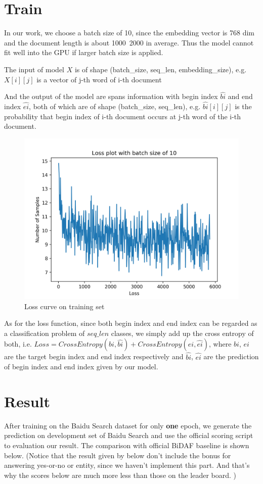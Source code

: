\documentclass{article}
\begin{document}
\section{Train}
In our work, we choose a batch size of 10, since the embedding vector is 768 dim and the document length is about 1000~2000 in average. Thus the model cannot fit well into the GPU if larger batch size is applied.

The input of model $X$ is of shape (batch\_size, seq\_len, embedding\_size), e.g. $X[i][j]$ is a vector of j-th word of i-th document 

And the output of the model are spans information with begin index $\hat{bi}$ and end index $\hat {ei}$, both of which are of shape (batch\_size, seq\_len), e.g. $\hat {bi}[i][j]$ is the probability that begin index of i-th document occurs at j-th word of the i-th document.

\begin{figure}[h]
	\centering
	\includegraphics[scale=0.4]{loss.png}
	\caption{Loss curve on training set}
\end{figure}

As for the loss function, since both begin index and end index can be regarded as a classification problem of $seq\_len$ classes, we simply add up the cross entropy of both, i.e. $Loss= CrossEntropy(bi, \hat {bi}) + CrossEntropy(ei, \hat{ei})$, where $bi$, $ei$ are the target begin index and end index respectively and $\hat{bi}$, $\hat{ei}$ are the prediction of begin index and end index given by our model.

\section{Result}
After training on the Baidu Search dataset for only \textbf{one} epoch, we generate the prediction on development set of Baidu Search and use the official scoring script to evaluation our result. The comparison with official BiDAF baseline is shown below. (Notice that the result given by below don't include the bonus for answering yes-or-no or entity, since we haven't implement this part. And that's why the scores below are much more less than those on the leader board. )
\end{document}
